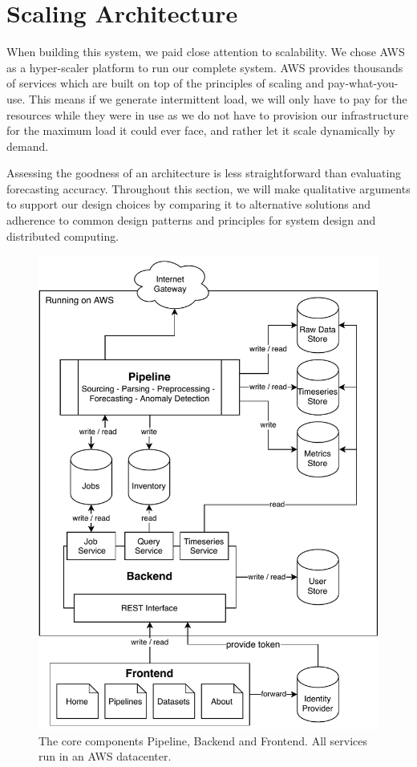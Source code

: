 \section{Scaling Architecture}

When building this system, we paid close attention to scalability. We chose AWS as a hyper-scaler platform to run our complete system. AWS provides thousands of services which are built on top of the principles of scaling and pay-what-you-use. This means if we generate intermittent load, we will only have to pay for the resources while they were in use as we do not have to provision our infrastructure for the maximum load it could ever face, and rather let it scale dynamically by demand.

Assessing the goodness of an architecture is less straightforward than evaluating forecasting accuracy. Throughout this section, we will make qualitative arguments to support our design choices by comparing it to alternative solutions and adherence to common design patterns and principles for system design and distributed computing.

\begin{figure}
\centerline{\includegraphics[scale=.7]{Figures/system-overview.pdf}}
\caption{The core components Pipeline, Backend and Frontend. All services run in an AWS datacenter.}
\label{fig:system-overview}
\end{figure}

